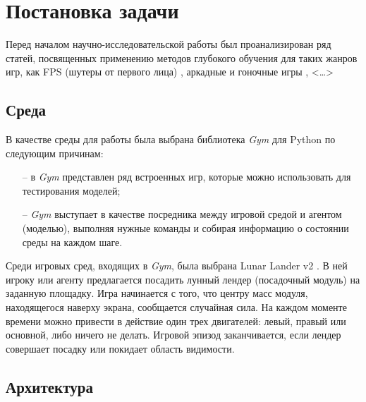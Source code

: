 \chapter{Постановка задачи}
\label{cha:analysis}
%
%

Перед началом научно-исследовательской работы был проанализирован ряд статей, посвященных применению методов глубокого обучения для таких жанров игр, как FPS (шутеры от первого лица) \cite{bergdahl2020augmenting}, аркадные и гоночные игры \cite{tufano2022using}, <…>

\section{Среда}

В качестве среды для работы была выбрана библиотека \textit{Gym} для Python \cite{Gym} по следующим причинам:
\begin{itemize}
	\item[--] в \textit{Gym} представлен ряд встроенных игр, которые можно использовать для тестирования моделей;
	\item[--] \textit{Gym} выступает в качестве посредника между игровой средой и агентом (моделью), выполняя нужные команды и собирая информацию о состоянии среды на каждом шаге.
\end{itemize}

Среди игровых сред, входящих в \textit{Gym}, была выбрана Lunar Lander v2 \cite{lunarlanderv2}. В ней игроку или агенту предлагается посадить лунный лендер (посадочный модуль) на заданную площадку. Игра начинается с того, что центру масс модуля, находящегося наверху экрана, сообщается случайная сила. На каждом моменте времени можно привести в действие один трех двигателей: левый, правый или основной, либо ничего не делать. Игровой эпизод заканчивается, если лендер совершает посадку или покидает область видимости.

\section{Архитектура}

